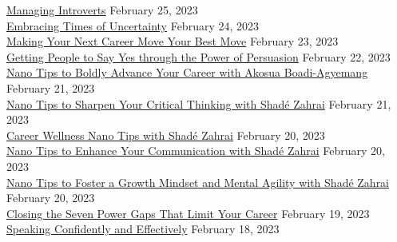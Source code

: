 \documentclass[10pt]{res} %
\begin{document}
\begin{resume}
\href{https://www.linkedin.com/learning/certificates/1f266ad8831c2f54b3632906b622ccc6b88a954127dcb204ae6a733e7b009558}{\color{blue}Managing Introverts} \hfill February 25, 2023 \\
\href{https://www.linkedin.com/learning/certificates/9bdf117e531cfa04de4c75873181918cbcf3b2e616d80e65f62c5aa110fb9636}{\color{blue}Embracing Times of Uncertainty} \hfill February 24, 2023 \\
\href{https://www.linkedin.com/learning/certificates/163086cb92d6eac0fc34f49b7bd3ec04d9868e8de1e57a063180a8b00380d3c6}{\color{blue}Making Your Next Career Move Your Best Move} \hfill February 23, 2023 \\
\href{https://www.linkedin.com/learning/certificates/e6274f8e49413e3a752abd39d5fb248c6df191865982839e591b7c4bbdc72883}{\color{blue}Getting People to Say Yes through the Power of Persuasion} \hfill February 22, 2023 \\
\href{https://www.linkedin.com/learning/certificates/02bf9e44a47bdb94fdaeb2c676dc1a9bd89e5e8ec198d214225a48e4fee9fb89}{\color{blue}Nano Tips to Boldly Advance Your Career with Akosua Boadi-Agyemang} \hfill February 21, 2023 \\
\href{https://www.linkedin.com/learning/certificates/3ff6798132b98627ab92d56b95708bdff397e458e52ebd23c35229192a3a552b}{\color{blue}Nano Tips to Sharpen Your Critical Thinking with Shadé Zahrai} \hfill February 21, 2023 \\
\href{https://www.linkedin.com/learning/certificates/5dec4e8eef0cf6faadd6ea06c4b3b5b5aed7655d730d267a2255b785ed853aa7}{\color{blue}Career Wellness Nano Tips with Shadé Zahrai} \hfill February 20, 2023 \\
\href{https://www.linkedin.com/learning/certificates/8b0515336e7adf93d9cdef8648134d1cc5d8248ddd48f2d087a0684e7f391548}{\color{blue}Nano Tips to Enhance Your Communication with Shadé Zahrai} \hfill February 20, 2023 \\
\href{https://www.linkedin.com/learning/certificates/f25bdd682bc16a3c051908031d53010c41c355f404404a13a50e9febfc91d91d}{\color{blue}Nano Tips to Foster a Growth Mindset and Mental Agility with Shadé Zahrai} \hfill February 20, 2023 \\
\href{https://www.linkedin.com/learning/certificates/b1d93b7f9117417575e202ca02bbe0f96c6746dd5389c9e7575f380afa273438}{\color{blue}Closing the Seven Power Gaps That Limit Your Career} \hfill February 19, 2023 \\
\href{https://www.linkedin.com/learning/certificates/ee95b2c21c835a287bb81f57ba4eb1171f97b157d30d6d96f4a2572dbbb46e6c}{\color{blue}Speaking Confidently and Effectively} \hfill February 18, 2023 \\

\end{resume}
\end{document}
